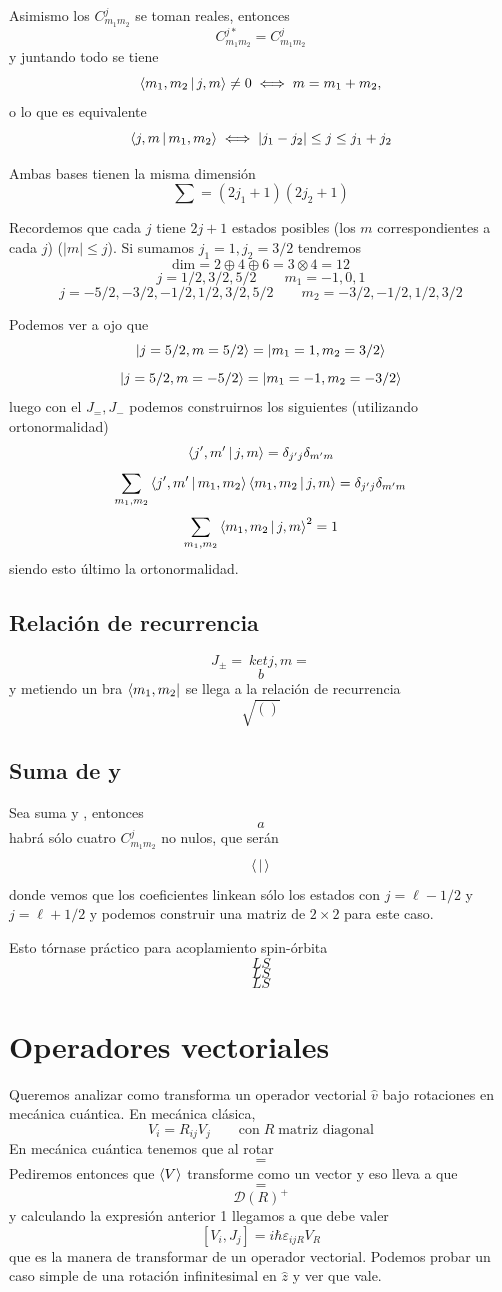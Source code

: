 \documentclass[10pt,oneside]{CBFT_book}
\begin{document}
Asimismo los $C_{m_1 m_2}^j$ se toman reales, entonces 
\[
	C_{m_1m_2}^{j*} = C_{m_1m_2}^{j}
\]
y juntando todo se tiene 
\[
	\Braket{m_1,m_2|j,m} \neq 0	\iff  m = m_1 + m_2,
\]
o lo que es equivalente
\[
	\Braket{j,m|m_1,m_2} \iff |j_1 - j_2| \leq j \leq j_1 + j_2
\]

Ambas bases tienen la misma dimensión
\[
	\sum = (2j_1 + 1)(2j_2 + 1)
\]

Recordemos que cada $j$ tiene $2j+1$ estados posibles (los $m$ correspondientes a cada $j$) ($|m|\leq j$). Si 
sumamos $j_1=1, j_2=3/2$ tendremos 
\[
	\text{dim} =  2 \oplus 4 \oplus 6 = 3 \otimes 4 = 12
\]
\[
	j = 1/2, 3/2, 5/2 \qquad m_1 = -1,0,1
\]
\[
	j = -5/2,-3/2,-1/2,1/2, 3/2, 5/2 \qquad m_2 = -3/2,-1/2,1/2,3/2
\]

Podemos ver a ojo que 
\[
	\Ket{j=5/2,m=5/2} = \Ket{m_1=1,m_2=3/2}
\]
\[
	\Ket{j=5/2,m=-5/2} = \Ket{m_1=-1,m_2=-3/2}
\]
luego con el $J_=, J_-$ podemos construirnos los siguientes (utilizando ortonormalidad)
\[
	\Braket{j',m'|j,m} = \delta_{j'j}\delta_{m'm}
\]
\[
	\sum_{m_1,m_2} \Braket{j',m'|m_1,m_2}\Braket{m_1,m_2|j,m} = \delta_{j'j}\delta_{m'm}
\]
\[
	\sum_{m_1,m_2} \Braket{m_1,m_2|j,m}^2 = 1
\]
siendo esto último la ortonormalidad.

\subsection{Relación de recurrencia}

\[
	J_\pm = \ ket{j,m} = 
\]
\[
	b
\]
y metiendo un bra $\Bra{m_1,m_2}$ se llega a la relación de recurrencia
\[
	\sqrt{()}
\]

\subsection{Suma de  y }

Sea suma  y , entonces 
\[
	a
\]
habrá sólo cuatro $C_{m_1 m_2}^j$ no nulos, que serán 
\[
	\Braket{|}
\]
donde vemos que los coeficientes linkean sólo los estados con $j=\ell-1/2$ y $j=\ell+1/2$ y podemos construir 
una 
matriz de $2\times 2$ para este caso.

Esto tórnase práctico para acoplamiento spin-órbita 
\[
	LS
\]
\[
	LS
\]
\[
	LS
\]

\section{Operadores vectoriales}

Queremos analizar como transforma un operador vectorial $\hat{v}$ bajo rotaciones en mecánica cuántica.
En mecánica clásica,
\[
	V_i = R_{ij} V_j \qquad \text{con} \; R \; \text{matriz diagonal}
\]
En mecánica cuántica tenemos que al rotar
\[
	=
\]
Pediremos entonces que $\Braket{V}$ transforme como un vector y eso lleva a que 
\[
	=
\]
\[
	\mathcal{D}(R)^+
\]
y calculando la expresión anterior 1 llegamos a que debe valer
\[
	[V_i,J_j] =  i\hbar \varepsilon_{ijR}V_R
\]
que es la manera de transformar de un operador vectorial. Podemos probar un caso simple de una rotación 
infinitesimal 
en $\hat{z}$ y ver que vale.
\end{document}

